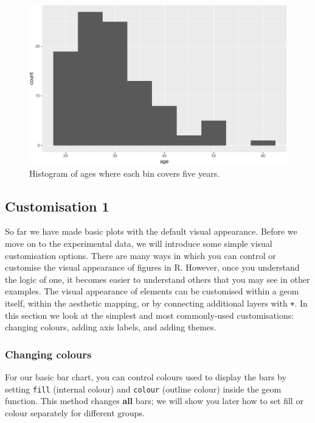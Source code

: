 \documentclass[
  english,
  doc,floatsintext]{apa6}
\begin{document}
\begin{figure}

{\centering \includegraphics[width=1\linewidth]{images/histogram2-1} 

}

\caption{Histogram of ages where each bin covers five years.}\label{fig:histogram2}
\end{figure}

\hypertarget{customisation-1}{%
\subsection{Customisation 1}\label{customisation-1}}

So far we have made basic plots with the default visual appearance. Before we move on to the experimental data, we will introduce some simple visual customisation options. There are many ways in which you can control or customise the visual appearance of figures in R. However, once you understand the logic of one, it becomes easier to understand others that you may see in other examples. The visual appearance of elements can be customised within a geom itself, within the aesthetic mapping, or by connecting additional layers with \texttt{+}. In this section we look at the simplest and most commonly-used customisations: changing colours, adding axis labels, and adding themes.

\hypertarget{changing-colours}{%
\subsubsection{Changing colours}\label{changing-colours}}

For our basic bar chart, you can control colours used to display the bars by setting \texttt{fill} (internal colour) and \texttt{colour} (outline colour) inside the geom function. This method changes \textbf{all} bars; we will show you later how to set fill or colour separately for different groups.
\end{document}
